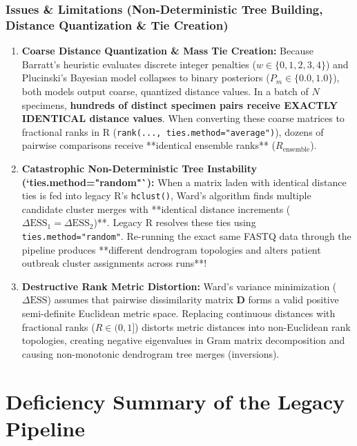 \documentclass[11pt,a4paper]{article}
\begin{document}
\subsubsection{Issues \& Limitations (Non-Deterministic Tree Building, Distance Quantization \& Tie Creation)}
\begin{enumerate}[leftmargin=*]
    \item \textbf{Coarse Distance Quantization \& Mass Tie Creation:} Because Barratt's heuristic evaluates discrete integer penalties ($w \in \{0, 1, 2, 3, 4\}$) and Plucinski's Bayesian model collapses to binary posteriors ($P_m \in \{0.0, 1.0\}$), both models output coarse, quantized distance values. In a batch of $N$ specimens, \textbf{hundreds of distinct specimen pairs receive EXACTLY IDENTICAL distance values}. When converting these coarse matrices to fractional ranks in R (\texttt{rank(..., ties.method="average")}), dozens of pairwise comparisons receive **identical ensemble ranks** ($R_{\text{ensemble}}$).
    \item \textbf{Catastrophic Non-Deterministic Tree Instability (`ties.method="random"`):} When a matrix laden with identical distance ties is fed into legacy R's \texttt{hclust()}, Ward's algorithm finds multiple candidate cluster merges with **identical distance increments ($\Delta \text{ESS}_1 = \Delta \text{ESS}_2$)**. Legacy R resolves these ties using \texttt{ties.method="random"}. Re-running the exact same FASTQ data through the pipeline produces **different dendrogram topologies and alters patient outbreak cluster assignments across runs**!
    \item \textbf{Destructive Rank Metric Distortion:} Ward's variance minimization ($\Delta \text{ESS}$) assumes that pairwise dissimilarity matrix $\mathbf{D}$ forms a valid positive semi-definite Euclidean metric space. Replacing continuous distances with fractional ranks ($R \in (0, 1]$) distorts metric distances into non-Euclidean rank topologies, creating negative eigenvalues in Gram matrix decomposition and causing non-monotonic dendrogram tree merges (inversions).
\end{enumerate}

\section{Deficiency Summary of the Legacy Pipeline}
\end{document}
